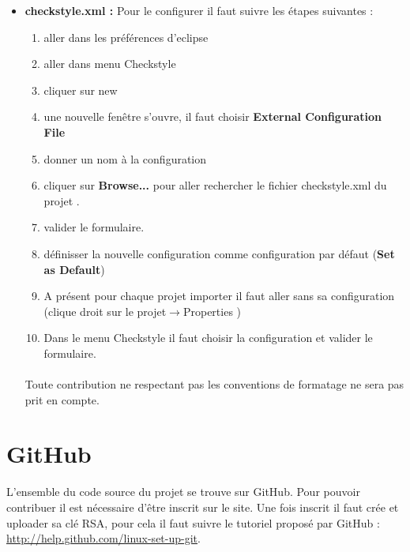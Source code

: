 \begin{itemize}
	\item  \textbf{checkstyle.xml :}
		Pour le configurer il faut suivre les étapes suivantes :
		\begin{enumerate}
				\item aller dans les préférences d'eclipse
				\item aller dans menu Checkstyle
				\item cliquer sur new
				\item une nouvelle fenêtre s'ouvre, il faut choisir \textbf{External Configuration File}
				\item donner un nom à la configuration
				\item cliquer sur \textbf{Browse...} pour aller rechercher le fichier checkstyle.xml du projet \youTestIt{}.
				\item valider le formulaire.
				\item définisser la nouvelle configuration comme configuration par défaut (\textbf{Set as Default})
				\item A présent pour chaque projet importer il faut aller sans sa configuration 
							(clique droit sur le projet$\rightarrow$Properties )
				\item Dans le menu Checkstyle  il faut choisir la configuration  \youTestIt{} et valider le formulaire.
		\end{enumerate}
	

	\paragraph{}	
	
	\begin{attention}
		Toute contribution ne respectant pas les conventions de formatage ne sera pas prit en compte.
	\end{attention}
	
\end{itemize}
\section{GitHub}
L'ensemble du code source du projet se trouve sur GitHub. Pour pouvoir contribuer il est
nécessaire d’être inscrit sur le site.  Une fois inscrit il faut crée et uploader sa clé RSA, pour cela il faut suivre le tutoriel proposé 
par GitHub : \href{http://help.github.com/linux-set-up-git/ }{http://help.github.com/linux-set-up-git}. 

